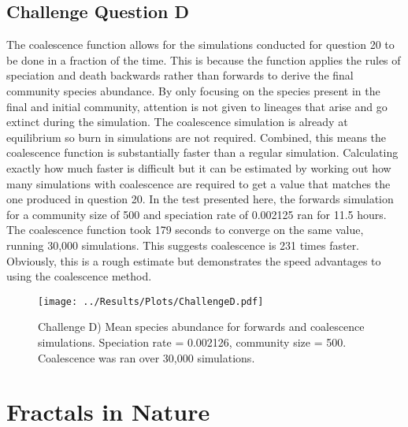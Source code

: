\documentclass[12pt]{article}
\begin{document}
    \subsection{Challenge Question D}
    The coalescence function allows for the simulations conducted for question 20 to be done in a fraction of the time. This is because the function applies the rules of speciation and death backwards rather than forwards to derive the final community species abundance. By only focusing on the species present in the final and initial community, attention is not given to lineages that arise and go extinct during the simulation. The coalescence simulation is already at equilibrium so burn in simulations are not required. Combined, this means the coalescence function is substantially faster than a regular simulation. Calculating exactly how much faster is difficult but it can be estimated by working out how many simulations with coalescence are required to get a value that matches the one produced in question 20. In the test presented here, the forwards simulation for a community size of 500 and speciation rate of 0.002125 ran for 11.5 hours. The coalescence function took 179 seconds to converge on the same value, running 30,000 simulations. This suggests coalescence is 231 times faster. Obviously, this is a rough estimate but demonstrates the speed advantages to using the coalescence method.	
	\begin{figure}[H]
		\centering
		\texttt{[image: ../Results/Plots/ChallengeD.pdf]}
		\caption{Challenge D) Mean species abundance for forwards and coalescence simulations. Speciation rate = 0.002126, community size = 500. Coalescence was ran over 30,000 simulations.}
	\end{figure}
	
	
	\section{Fractals in Nature}
\end{document}
